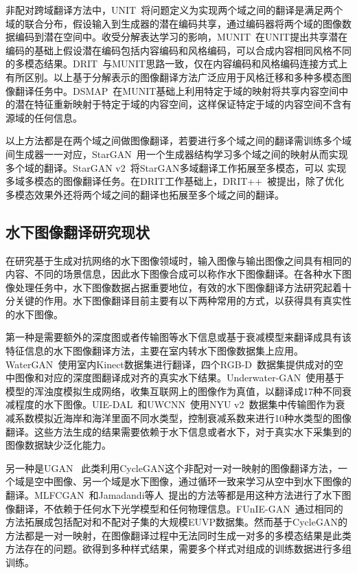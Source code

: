 非配对跨域翻译方法中，UNIT~\cite{liu2017unsupervised}将问题定义为实现两个域之间的翻译是满足两个域的联合分布，假设输入到生成器的潜在编码共享，通过编码器将两个域的图像数据编码到潜在空间中。收受分解表达学习的影响，MUNIT~\cite{huang2018multimodal}在UNIT提出共享潜在编码的基础上假设潜在编码包括内容编码和风格编码，可以合成内容相同风格不同的多模态结果。DRIT~\cite{lee2018diverse}与MUNIT思路一致，仅在内容编码和风格编码连接方式上有所区别。以上基于分解表示的图像翻译方法广泛应用于风格迁移和多种多模态图像翻译任务中。DSMAP~\cite{chang2020domain}在MUNIT基础上利用特定于域的映射将共享内容空间中的潜在特征重新映射于特定于域的内容空间，这样保证特定于域的内容空间不含有源域的任何信息。

以上方法都是在两个域之间做图像翻译，若要进行多个域之间的翻译需训练多个域间生成器一一对应，StarGAN~\cite{choi2018stargan}用一个生成器结构学习多个域之间的映射从而实现多个域的翻译。StarGAN v2~\cite{choi2020stargan}将StarGAN多域翻译工作拓展至多模态，可以 实现多域多模态的图像翻译任务。在DRIT工作基础上，DRIT++~\cite{lee2020drit++}被提出，除了优化多模态效果外还将两个域之间的翻译也拓展至多个域之间的翻译。


\subsection{水下图像翻译研究现状} 
在研究基于生成对抗网络的水下图像领域时，输入图像与输出图像之间具有相同的内容、不同的场景信息，因此水下图像合成可以称作水下图像翻译。在各种水下图像处理任务中，水下图像数据占据重要地位，有效的水下图像翻译方法研究起着十分关键的作用。水下图像翻译目前主要有以下两种常用的方式，以获得具有真实性的水下图像。

第一种是需要额外的深度图或者传输图等水下信息或基于衰减模型来翻译成具有该特征信息的水下图像翻译方法，主要在室内转水下图像数据集上应用。WaterGAN~\cite{li2017watergan}使用室内Kinect数据集进行翻译，四个RGB-D~\cite{janoch2013category,lai2014unsupervised,silberman2011indoor,shotton2013scene}数据集提供成对的空中图像和对应的深度图翻译成对齐的真实水下结果。Underwater-GAN~\cite{yu2018underwater}使用基于模型的浑浊度模拟生成网络，收集互联网上的图像作为真值，以翻译成17种不同衰减程度的水下图像。UIE-DAL~\cite{uplavikar2019all}和UWCNN~\cite{li2020underwater}使用NYU v2~\cite{silberman2012indoor}数据集中传输图作为衰减系数模拟近海岸和海洋里面不同水类型，控制衰减系数来进行10种水类型的图像翻译。这些方法生成的结果需要依赖于水下信息或者水下，对于真实水下采集到的图像数据缺少泛化能力。

另一种是UGAN~
\cite{fabbri2018enhancing}此类利用CycleGAN这个非配对一对一映射的图像翻译方法，一个域是空中图像、另一个域是水下图像，通过循环一致来学习从空中到水下图像的翻译。MLFCGAN~\cite{liu2019mlfCGAN}和Jamadandi等人~\cite{jamadandi2019exemplar}提出的方法等都是用这种方法进行了水下图像翻译，不依赖于任何水下光学模型和任何物理信息。FUnIE-GAN~\cite{islam2020fast}通过相同的方法拓展成包括配对和不配对子集的大规模EUVP数据集。然而基于CycleGAN的方法都是一对一映射，在图像翻译过程中无法同时生成一对多的多模态结果是此类方法存在的问题。欲得到多种样式结果，需要多个样式对组成的训练数据进行多组训练。


